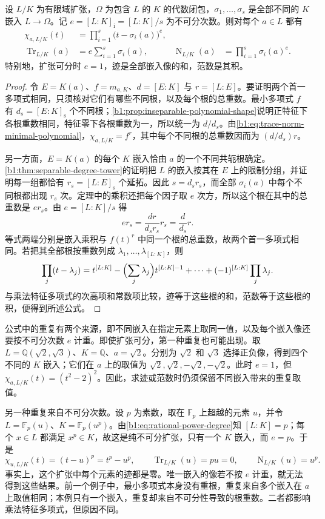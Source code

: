 \begin{theorem}\label{b1:thm:trace-norm-embeddings}
	设 \(L/K\) 为有限域扩张，\(\Omega\) 为包含 \(L\) 的 \(K\) 的代数闭包，\(\sigma_1,\ldots,\sigma_s\) 是全部不同的 \(K\) 嵌入 \(L\rightarrow\Omega\)。记 \(e=[L:K]_{\mathrm i}=[L:K]/s\) 为不可分次数。则对每个 \(a\in L\) 都有
	\begin{align*}
		\chi_{a,L/K}(t)&=\prod_{i=1}^s\bigl(t-\sigma_i(a)\bigr)^e,\\
		\operatorname{Tr}_{L/K}(a)&=e\sum_{i=1}^s\sigma_i(a),& \operatorname{N}_{L/K}(a)&=\prod_{i=1}^s\sigma_i(a)^e.
	\end{align*}
	特别地，扩张可分时 \(e=1\)，迹是全部嵌入像的和，范数是其积。
\end{theorem}
\begin{proof}
	令 \(E=K(a)\)、\(f=m_{a,K}\)、\(d=[E:K]\) 与 \(r=[L:E]\)。要证明两个首一多项式相同，只须核对它们有哪些不同根，以及每个根的总重数。最小多项式 \(f\) 有 \(d_s=[E:K]_{\mathrm s}\) 个不同根；\cref{b1:prop:inseparable-polynomial-shape}说明正特征下各根重数相同，特征零下各根重数为一，所以统一为 \(d/d_s\)。由\eqref{b1:eq:trace-norm-minimal-polynomial}，\(\chi_{a,L/K}=f^r\)，其中每个不同根的总重数因而为 \((d/d_s)r\)。

	另一方面，\(E=K(a)\) 的每个 \(K\) 嵌入恰由 \(a\) 的一个不同共轭根确定。\cref{b1:thm:separable-degree-tower}的证明把 \(L\) 的嵌入按其在 \(E\) 上的限制分组，并证明每一组都恰有 \(r_s=[L:E]_{\mathrm s}\) 个延拓。因此 \(s=d_s r_s\)，而全部 \(\sigma_i(a)\) 中每个不同根都出现 \(r_s\) 次。定理中的乘积还把每个因子取 \(e\) 次方，所以这个根在其中的总重数是 \(e r_s\)。由 \(e=[L:K]/s\) 得
	\[
		e r_s=\frac{dr}{d_s r_s}r_s=\frac d{d_s}r.
	\]
	等式两端分别是嵌入乘积与 \(f(t)^r\) 中同一个根的总重数，故两个首一多项式相同。若把其全部根按重数列成 \(\lambda_1,\ldots,\lambda_{[L:K]}\)，则
	\[
		\prod_j(t-\lambda_j) =t^{[L:K]}-\Bigl(\sum_j\lambda_j\Bigr)t^{[L:K]-1} +\cdots+(-1)^{[L:K]}\prod_j\lambda_j.
	\]
	与乘法特征多项式的次高项和常数项比较，迹等于这些根的和，范数等于这些根的积，便得到所述公式。
\end{proof}
公式中的重复有两个来源，即不同嵌入在指定元素上取同一值，以及每个嵌入像还要按不可分次数 \(e\) 计重。即使扩张可分，第一种重复也可能出现。取 \(L=\mathbb Q(\sqrt2,\sqrt3)\)、\(K=\mathbb Q\)、\(a=\sqrt2\)。分别为 \(\sqrt2\) 和 \(\sqrt3\) 选择正负像，得到四个不同的 \(K\) 嵌入；它们在 \(a\) 上的取值为 \(\sqrt2,\sqrt2,-\sqrt2,-\sqrt2\)。此时 \(e=1\)，但 \(\chi_{a,L/K}(t)=(t^2-2)^2\)。因此，求迹或范数时仍须保留不同嵌入带来的重复取值。

\ProseParagraphBreak

另一种重复来自不可分次数。设 \(p\) 为素数，取在 \(\mathbb F_p\) 上超越的元素 \(u\)，并令 \(L=\mathbb F_p(u)\)、\(K=\mathbb F_p(u^p)\)。由\eqref{b1:eq:rational-power-degree}知 \([L:K]=p\)；每个 \(x\in L\) 都满足 \(x^p\in K\)，故这是纯不可分扩张，只有一个 \(K\) 嵌入，而 \(e=p\)。于是
\[
	\chi_{u,L/K}(t)=(t-u)^p=t^p-u^p,\qquad \operatorname{Tr}_{L/K}(u)=pu=0,\qquad \operatorname{N}_{L/K}(u)=u^p.
\]
事实上，这个扩张中每个元素的迹都是零。唯一嵌入的像若不按 \(e\) 计重，就无法得到这些结果。前一个例子中，最小多项式本身没有重根，重复来自多个嵌入在 \(a\) 上取值相同；本例只有一个嵌入，重复却来自不可分性导致的根重数。二者都影响乘法特征多项式，但原因不同。
